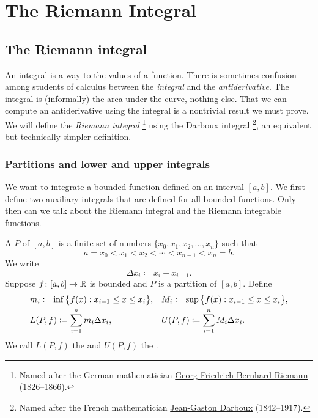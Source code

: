 \chapter{The Riemann Integral} \label{int:chapter}


\section{The Riemann integral}
\label{sec:rint}



An integral is a way to  the values of a function.
There is sometimes confusion among students of
calculus between the \emph{integral} and the \emph{antiderivative}.
The integral is (informally) the area under the curve, nothing else.
That we can compute an antiderivative using the integral is a nontrivial
result we must prove.  
We will define the \emph{Riemann integral}%
\footnote{Named after the German mathematician
\href{https://en.wikipedia.org/wiki/Riemann}{Georg Friedrich Bernhard Riemann}
(1826--1866).}
using the Darboux integral%
\footnote{Named after the French mathematician
\href{https://en.wikipedia.org/wiki/Darboux}{Jean-Gaston Darboux} (1842--1917).},
an equivalent but technically simpler definition.

\subsection{Partitions and lower and upper integrals}

We want to integrate a bounded function defined on an interval $[a,b]$.
We first define two auxiliary integrals that are defined for all
bounded functions.  Only then can we talk about the Riemann integral and
the Riemann integrable functions.

\begin{defn}
A \emph{} $P$ of $[a,b]$ is
a finite set of numbers $\{ x_0,x_1,x_2,\ldots,x_n \}$ such that
\begin{equation*}
a = x_0 < x_1 < x_2 < \cdots < x_{n-1} < x_n = b .
\end{equation*}
We write
\begin{equation*}
\Delta x_i \coloneqq x_i - x_{i-1} .
\end{equation*}
Suppose $f \colon [a,b] \to {\mathbb{R}}$ is bounded and $P$ is a partition of
$[a,b]$.
Define
\begin{align*}
& m_i \coloneqq \inf \, \bigl\{ f(x) : x_{i-1} \leq x \leq x_i \bigr\} , &
& M_i \coloneqq \sup \, \bigl\{ f(x) : x_{i-1} \leq x \leq x_i \bigr\} , \\
& L(P,f) \coloneqq
\sum_{i=1}^n m_i \Delta x_i , &
& U(P,f) \coloneqq
\sum_{i=1}^n M_i \Delta x_i .
\avoidbreak
\end{align*}
We call $L(P,f)$ the \emph{} and
$U(P,f)$ the \emph{}.
\end{defn}

